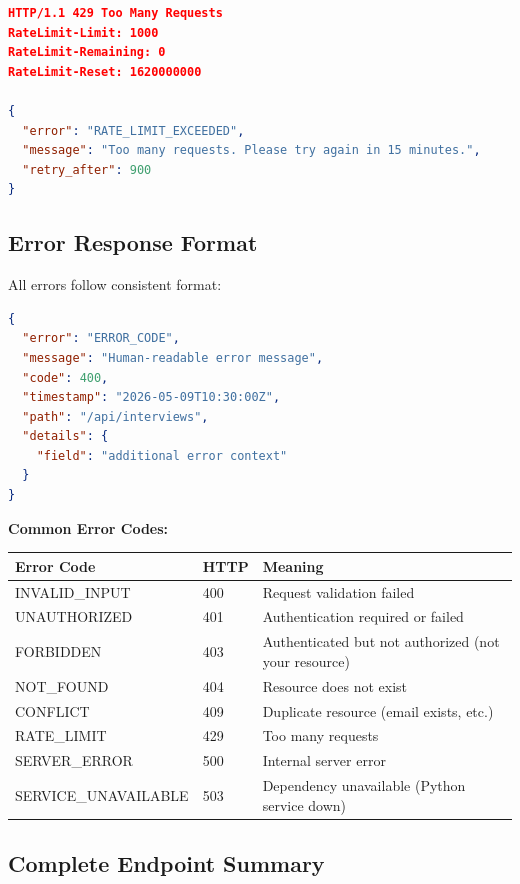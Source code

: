 \documentclass[12pt,a4paper,oneside]{article}
\begin{document}
\begin{lstlisting}[language=JSON, caption=Rate Limit Exceeded Response]
HTTP/1.1 429 Too Many Requests
RateLimit-Limit: 1000
RateLimit-Remaining: 0
RateLimit-Reset: 1620000000

{
  "error": "RATE_LIMIT_EXCEEDED",
  "message": "Too many requests. Please try again in 15 minutes.",
  "retry_after": 900
}
\end{lstlisting}

\subsection{Error Response Format}

All errors follow consistent format:

\begin{lstlisting}[language=JSON, caption=Standard Error Format]
{
  "error": "ERROR_CODE",
  "message": "Human-readable error message",
  "code": 400,
  "timestamp": "2026-05-09T10:30:00Z",
  "path": "/api/interviews",
  "details": {
    "field": "additional error context"
  }
}
\end{lstlisting}

\textbf{Common Error Codes:}

\begin{table}[H]
\centering
\small
\begin{tabular}{|p{2cm}|p{1.8cm}|p{7.2cm}|}
\hline
\textbf{Error Code} & \textbf{HTTP} & \textbf{Meaning} \\
\hline
INVALID\_INPUT & 400 & Request validation failed \\
\hline
UNAUTHORIZED & 401 & Authentication required or failed \\
\hline
FORBIDDEN & 403 & Authenticated but not authorized (not your resource) \\
\hline
NOT\_FOUND & 404 & Resource does not exist \\
\hline
CONFLICT & 409 & Duplicate resource (email exists, etc.) \\
\hline
RATE\_LIMIT & 429 & Too many requests \\
\hline
SERVER\_ERROR & 500 & Internal server error \\
\hline
SERVICE\_UNAVAILABLE & 503 & Dependency unavailable (Python service down) \\
\hline
\end{tabular}
\end{table}

\subsection{Complete Endpoint Summary}
\end{document}
